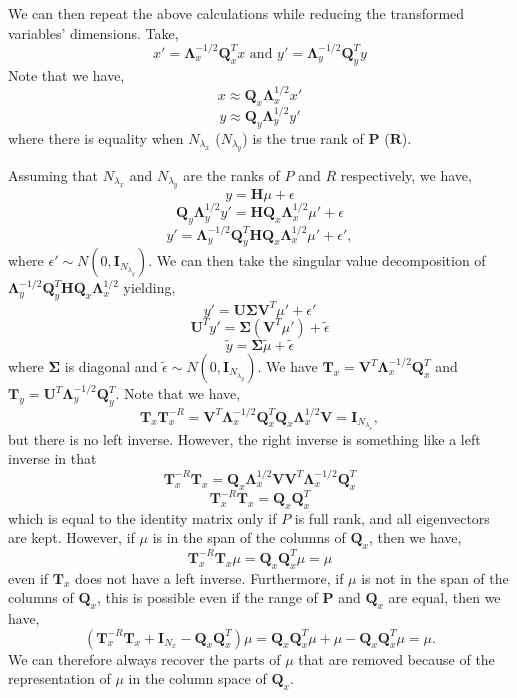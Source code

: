 \documentclass[11pt]{article} %
\newcommand{\mat}{\mathbf}
\begin{document}
We can then repeat the above calculations while reducing the
transformed variables' dimensions.
Take,
\[
  x' = \mat{\Lambda}_x^{-1/2} \mat{Q}_x^T x
  \text{ and }
  y' = \mat{\Lambda}_y^{-1/2} \mat{Q}_y^T y
\]
Note that we have,
\[
  x \approx \mat{Q}_x \mat{\Lambda}_x^{1/2} x'
\]
\[
  y \approx \mat{Q}_y \mat{\Lambda}_y^{1/2} y'
\]
where there is equality when $N_{\lambda_x}$ ($N_{\lambda_y}$) is the
true rank of $\mat{P}$ ($\mat{R}$).

Assuming that $N_{\lambda_x}$ and $N_{\lambda_y}$ are the ranks of $P$
and $R$ respectively, we have,
\[
  y = \mat{H} \mu + \epsilon
\]
\[
  \mat{Q}_y \mat{\Lambda}_y^{1/2} y' = \mat{H}
  \mat{Q}_x \mat{\Lambda}_x^{1/2} \mu' + \epsilon
\]
\[
  y' = \mat{\Lambda}_y^{-1/2} \mat{Q}_y^T \mat{H}
  \mat{Q}_x \mat{\Lambda}_x^{1/2} \mu' + \epsilon',
\]
where $\epsilon' \sim N(0, \mat{I}_{N_{\lambda_y}})$.
We can then take the singular value decomposition of
$\mat{\Lambda}_y^{-1/2} \mat{Q}_y^T \mat{H} \mat{Q}_x
\mat{\Lambda}_x^{1/2}$ yielding,
\[
  y' = \mat{U} \mat{\Sigma} \mat{V}^{T} \mu' + \epsilon'
\]
\[
  \mat{U}^T y' = \mat{\Sigma} (\mat{V}^T \mu') + \tilde{\epsilon}
\]
\[
  \tilde{y}= \mat{\Sigma} \tilde{\mu} + \tilde{\epsilon}
\]
where $\mat{\Sigma}$ is diagonal and $\tilde{\epsilon} \sim N(0,
\mat{I}_{N_{\lambda_y}})$.
We have $\mat{T}_x = \mat{V}^T \mat{\Lambda}_x^{-1/2} \mat{Q}_x^T$ and
$\mat{T}_y = \mat{U}^T \mat{\Lambda}_y^{-1/2} \mat{Q}_y^T$.
Note that we have,
\[
  \mat{T}_x \mat{T}_x^{-R} = \mat{V}^T \mat{\Lambda}_x^{-1/2}
  \mat{Q}_x^T \mat{Q}_x \mat{\Lambda}_x^{1/2} \mat{V} = \mat{I}_{N_{\lambda_x}},
\]
but there is no left inverse.
However, the right inverse is something like a left inverse in that
\[
  \mat{T}_x^{-R} \mat{T}_x = \mat{Q}_x \mat{\Lambda}_x^{1/2} \mat{V}
  \mat{V}^T \mat{\Lambda}_x^{-1/2} \mat{Q}_x^T
\]
\[
  \mat{T}_x^{-R} \mat{T}_x = \mat{Q}_x \mat{Q}_x^T
\]
which is equal to the identity matrix only if $P$ is full rank, and
all eigenvectors are kept.
However, if $\mu$ is in the span of the columns of $\mat{Q}_x$, then
we have,
\[
  \mat{T}_x^{-R} \mat{T}_x \mu = \mat{Q}_x \mat{Q}_x^T \mu = \mu
\]
even if $\mat{T}_x$ does not have a left inverse.
Furthermore, if $\mu$ is not in the span of the columns of
$\mat{Q}_x$, this is possible even if the range of $\mat{P}$ and
$\mat{Q}_x$ are equal, then we have,
\[
  (\mat{T}_x^{-R} \mat{T}_x + \mat{I}_{N_x} - \mat{Q}_x \mat{Q}_x^T)
  \mu = \mat{Q}_x \mat{Q}_x^T \mu  + \mu - \mat{Q}_x \mat{Q}_x^T \mu =
  \mu.
\]
We can therefore always recover the parts of $\mu$ that are removed
because of the representation of $\mu$ in the column space of $\mat{Q}_x$.
\end{document}
